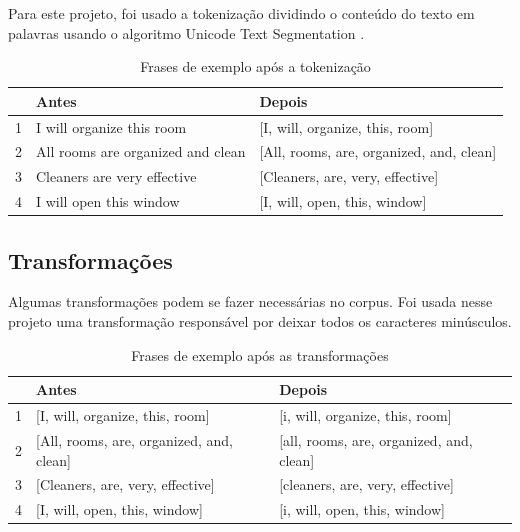 Para este projeto, foi usado a tokenização dividindo o conteúdo do texto em palavras usando o algoritmo Unicode Text Segmentation \cite{unicodesegmentation}.

\begin{table}[htb]
	\centering
    \def\arraystretch{1.2} %
    \begin{tabular}{|l|l|l|}
        \hline
        & \textbf{Antes} & \textbf{Depois} \\ \hline
        1 & I will organize this room & [I, will, organize, this, room]            \\ \hline
        2 & All rooms are organized and clean & [All, rooms, are, organized, and, clean] \\ \hline
        3 & Cleaners are very effective & [Cleaners, are, very, effective]                              \\ \hline
        4 & I will open this window & [I, will, open, this, window]                             \\ \hline
    \end{tabular}
	\caption{Frases de exemplo após a tokenização}
    \label{tab:tokenization}
\end{table}

\subsection{Transformações}
Algumas transformações podem se fazer necessárias no corpus. Foi usada nesse projeto uma transformação responsável por deixar todos os caracteres minúsculos.

\begin{table}[htb]
	\centering
    \def\arraystretch{1.2} %
    \begin{tabular}{|l|l|l|}
        \hline
        & \textbf{Antes} & \textbf{Depois} \\ \hline
        1 & [I, will, organize, this, room] & [i, will, organize, this, room]            \\ \hline
        2 & [All, rooms, are, organized, and, clean] & [all, rooms, are, organized, and, clean] \\ \hline
        3 & [Cleaners, are, very, effective] & [cleaners, are, very, effective]                              \\ \hline
        4 & [I, will, open, this, window] & [i, will, open, this, window]                             \\ \hline
    \end{tabular}
	\caption{Frases de exemplo após as transformações}
    \label{tab:transformations}
\end{table}


